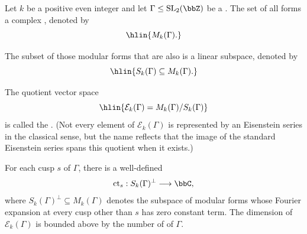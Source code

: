\begin{definition} \label{definition:vector_space_of_modular_and_cusp_forms}
Let $k$ be a positive even integer and let $\Gamma \leq \mathrm{SL}_2(\bbZ)$ be a . The set of all  forms a complex , denoted by
$$\hlin{M_k(\Gamma).}$$

The subset of those modular forms that are also  is a linear subspace, denoted by
$$\hlin{S_k(\Gamma) \subseteq M_k(\Gamma).}$$

The quotient vector space
$$\hlin{\mathcal{E}_k(\Gamma) = M_k(\Gamma) / S_k(\Gamma)}$$
is called the . (Not every element of $\mathcal{E}_k(\Gamma)$ is represented by an Eisenstein series in the classical sense, but the name reflects that the image of the standard Eisenstein series spans this quotient when it exists.)

For each cusp $s$ of $\Gamma$, there is a well-defined 
$$\operatorname{ct}_s : S_k(\Gamma)^\perp \longrightarrow \bbC,$$
where $S_k(\Gamma)^\perp \subseteq M_k(\Gamma)$ denotes the subspace of modular forms whose Fourier expansion at every cusp other than $s$ has zero constant term. The dimension of $\mathcal{E}_k(\Gamma)$ is bounded above by the number of  of $\Gamma$.

\end{definition}
